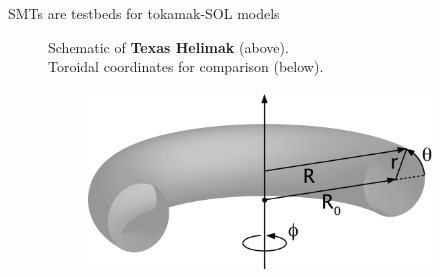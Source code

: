 \documentclass[12pt,table]{beamer}
\begin{document}
\begin{frame}{SMTs are testbeds for tokamak-SOL models}
\begin{minipage}[t]{0.5\linewidth}
\begin{figure}
        \tiny Schematic of \textbf{Texas Helimak} (above). \\ Toroidal coordinates for comparison (below). 
        \hfill
        \begin{figure}
            \centering
        \includegraphics[width=.6\linewidth]{figs/Toroidal_coordinates.png}
        \end{figure}
    \end{figure}
    \hfill
    \end{minipage}%
\end{frame}

\end{document}
